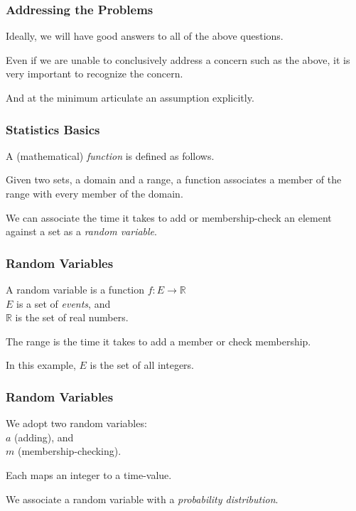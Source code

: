 \begin{frame}
\frametitle{Addressing the Problems}
\begin{changemargin}{1cm}

Ideally, we will have good answers to all of the above questions.

Even if we are unable to conclusively address a concern such
as the above, it is very important to recognize the concern. 

And
at the minimum articulate an assumption explicitly.

\end{changemargin}
\end{frame}

\begin{frame}
\frametitle{Statistics Basics}
\begin{changemargin}{1cm}

A (mathematical) \emph{function} is defined as follows. 

Given two sets, a domain and a range, a function associates a member of the
range with every member of the domain.

We can associate the time it takes to add or membership-check
an element against a set as a \emph{random variable}.

\end{changemargin}
\end{frame}

\begin{frame}
\frametitle{Random Variables}
\begin{changemargin}{1cm}

A random variable is a function
$f\!\! : E \longrightarrow \mathbb{R}$\\
\quad $E$ is a set of \emph{events}, and\\
\quad $\mathbb{R}$ is the set of real numbers.


The range is the time it takes to add a member or check membership.

In this example, $E$ is the set of all integers.

\end{changemargin}
\end{frame}


\begin{frame}
\frametitle{Random Variables}
\begin{changemargin}{1cm}

We adopt two random variables:\\
\quad $a$ (adding), and \\
\quad $m$ (membership-checking). 

Each maps an integer to a time-value. 

We associate a random variable with a \emph{probability distribution}.

\end{changemargin}
\end{frame}


